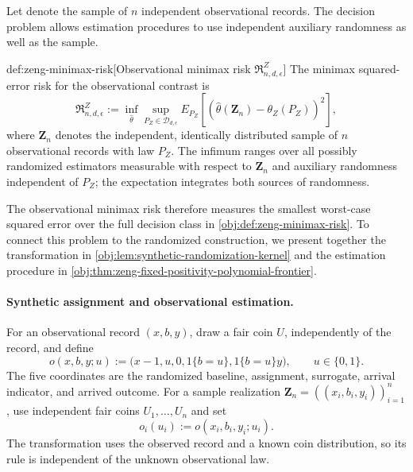 \documentclass[11pt]{article}
\begin{document}
Let  denote the sample of \(n\) independent observational records. The decision problem allows estimation procedures to use independent auxiliary randomness as well as the sample.
\begin{definitionv}{def:zeng-minimax-risk}[Observational minimax risk \(\mathfrak R^Z_{n,d,\epsilon}\)]
The minimax squared-error risk for the observational contrast is
\[
\mathfrak R^Z_{n,d,\epsilon}
:=\inf_{\widehat\theta}
\sup_{P_Z\in\mathcal D_{d,\epsilon}}
E_{P_Z}\!\left[
(\widehat\theta(\mathbf Z_n)-\theta_Z(P_Z))^2
\right],
\]
where \(\mathbf Z_n\) denotes the independent, identically distributed sample of \(n\) observational records with law \(P_Z\). The infimum ranges over all possibly randomized estimators measurable with respect to \(\mathbf Z_n\) and auxiliary randomness independent of \(P_Z\); the expectation integrates both sources of randomness.
\end{definitionv}

The observational minimax risk  therefore measures the smallest worst-case squared error over the full decision class in \cref{obj:def:zeng-minimax-risk}. To connect this problem to the randomized construction, we present together the transformation in \cref{obj:lem:synthetic-randomization-kernel} and the estimation procedure in \cref{obj:thm:zeng-fixed-positivity-polynomial-frontier}.

\paragraph{Synthetic assignment and observational estimation.}
For an observational record \((x,b,y)\), draw a fair coin \(U\), independently of the record, and define
\[
o(x,b,y;u)
:=
\bigl(x-1,u,0,1\{b=u\},1\{b=u\}y\bigr),
\qquad u\in\{0,1\}.
\]
The five coordinates are the randomized baseline, assignment, surrogate, arrival indicator, and arrived outcome. For a sample realization \(\mathbf Z_n=((x_i,b_i,y_i))_{i=1}^n\), use independent fair coins \(U_1,\ldots,U_n\) and set
\[
o_i(u_i):=o(x_i,b_i,y_i;u_i).
\]
The transformation uses the observed record and a known coin distribution, so its rule is independent of the unknown observational law.
\end{document}
